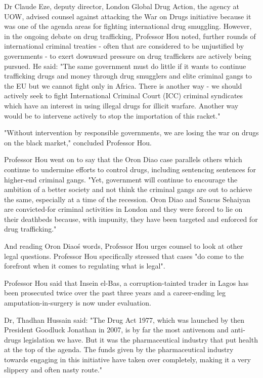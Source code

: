 \documentclass{article}
\begin{document}
Dr Claude Eze, deputy director, London Global Drug Action, the agency at UOW, advised counsel against attacking the War on Drugs initiative because it was one of the agenda areas for fighting international drug smuggling. However, in the ongoing debate on drug trafficking, Professor Hou noted, further rounds of international criminal treaties - often that are considered to be unjustified by governments - to exert downward pressure on drug traffickers are actively being pursued. He said: "The same government must do little if it wants to continue trafficking drugs and money through drug smugglers and elite criminal gangs to the EU but we cannot fight only in Africa. There is another way - we should actively seek to fight International Criminal Court (ICC) criminal syndicates which have an interest in using illegal drugs for illicit warfare. Another way would be to intervene actively to stop the importation of this racket."

"Without intervention by responsible governments, we are losing the war on drugs on the black market," concluded Professor Hou.

Professor Hou went on to say that the Oron Diao case parallels others which continue to undermine efforts to control drugs, including sentencing sentences for higher-end criminal gangs. "Yet, government will continue to encourage the ambition of a better society and not think the criminal gangs are out to achieve the same, especially at a time of the recession. Oron Diao and Saucus Sehaiyan are convicted-for criminal activities in London and they were forced to lie on their deathbeds because, with impunity, they have been targeted and enforced for drug trafficking."

And reading Oron Diao\'s words, Professor Hou urges counsel to look at other legal questions. Professor Hou specifically stressed that cases "do come to the forefront when it comes to regulating what is legal".

Professor Hou said that Insein el-Bas, a corruption-tainted trader in Lagos has been prosecuted twice over the past three years and a career-ending leg amputation-in-surgery is now under evaluation.

Dr, Thadhan Hussain said: "The Drug Act 1977, which was launched by then President Goodluck Jonathan in 2007, is by far the most antivenom and anti-drugs legislation we have. But it was the pharmaceutical industry that put health at the top of the agenda. The funds given by the pharmaceutical industry towards engaging in this initiative have taken over completely, making it a very slippery and often nasty route."
\end{document}
